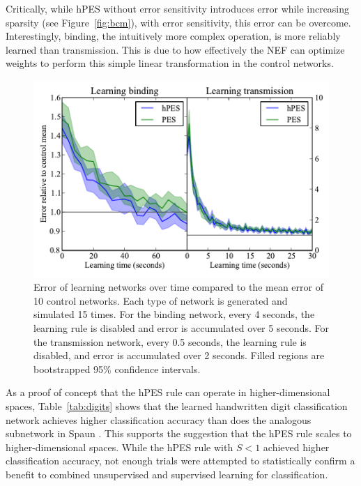 \documentclass[10pt,letterpaper]{article}
\begin{document}
Critically, while hPES without error sensitivity
introduces error while increasing sparsity
(see Figure~\ref{fig:bcm}), with error sensitivity,
this error can be overcome.
Interestingly, binding,
the intuitively more complex operation,
is more reliably learned than transmission.
This is due to how effectively
the NEF can optimize weights to perform
this simple linear transformation
in the control networks.

\begin{figure}[ht]
\begin{center}
\includegraphics[width=\columnwidth]{fig4-learn-curves}
\end{center}
\caption{Error of learning networks over time compared
  to the mean error of 10 control networks.
  Each type of network is generated and simulated 15 times.
  For the binding network, every 4 seconds,
  the learning rule is disabled and error is accumulated
  over 5 seconds.
  For the transmission network, every 0.5 seconds,
  the learning rule is disabled,
  and error is accumulated over 2 seconds.
  Filled regions are bootstrapped 95\% confidence intervals.}
\label{fig:learn}
\end{figure}

As a proof of concept that the hPES rule
can operate in higher-dimensional spaces,
Table~\ref{tab:digits} shows that 
the learned handwritten digit classification network
achieves higher classification
accuracy than does the analogous
subnetwork in Spaun \cite{Eliasmith2012}.
This supports the suggestion that the hPES rule
scales to higher-dimensional spaces.
While the hPES rule with $S < 1$
achieved higher classification accuracy,
not enough trials were attempted to
statistically confirm a benefit to combined
unsupervised and supervised learning for classification.
\end{document}
